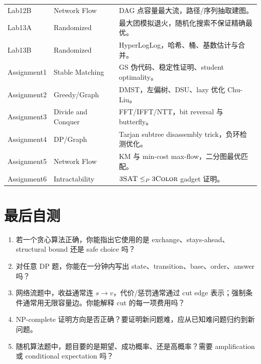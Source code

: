 \documentclass[UTF8,a4paper,11pt]{ctexart}
\begin{document}
\begin{longtable}{p{2.6cm}p{4.1cm}p{7.8cm}}
Lab12B & Network Flow & DAG 点容量最大流，路径/序列抽取建图。\\
Lab13A & Randomized & 最大团模拟退火，随机化搜索不保证精确最优。\\
Lab13B & Randomized & HyperLogLog，哈希、桶、基数估计与合并。\\
\midrule
Assignment1 & Stable Matching & GS 伪代码、稳定性证明、student optimality。\\
Assignment2 & Greedy/Graph & DMST，左偏树、DSU、lazy 优化 Chu-Liu。\\
Assignment3 & Divide and Conquer & FFT/IFFT/NTT，bit reversal 与 butterfly。\\
Assignment4 & DP/Graph & Tarjan subtree disassembly trick，负环检测优化。\\
Assignment5 & Network Flow & KM 与 min-cost max-flow，二分图最优匹配。\\
Assignment6 & Intractability & $3\textsc{SAT}\le_P 3\textsc{Color}$ gadget 证明。\\
\bottomrule
\end{longtable}

\section{最后自测}

\begin{enumerate}
  \item 若一个贪心算法正确，你能指出它使用的是 exchange、stays-ahead、structural bound 还是 safe choice 吗？
  \item 对任意 DP 题，你能在一分钟内写出 state、transition、base、order、answer 吗？
  \item 网络流题中，收益通常连 $s\to v$，代价/惩罚通常通过 cut edge 表示；强制条件通常用无限容量边。你能解释 cut 的每一项费用吗？
  \item NP-complete 证明方向是否正确？要证明新问题难，应从已知难问题归约到新问题。
  \item 随机算法题中，题目要的是期望、成功概率、还是高概率？需要 amplification 或 conditional expectation 吗？
\end{enumerate}
\end{document}
